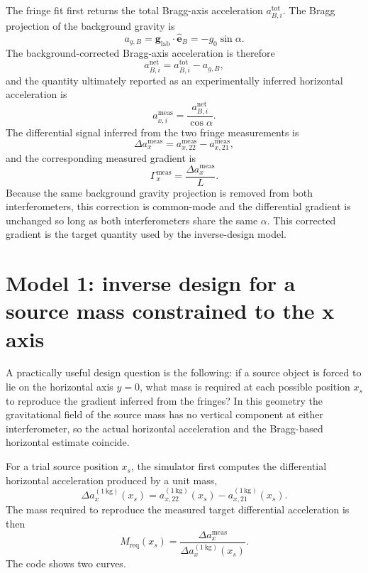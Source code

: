 \documentclass[11pt]{article}
\begin{document}
The fringe fit first returns the total Bragg-axis acceleration $a^{\mathrm{tot}}_{B,i}$. The Bragg projection of the background gravity is
\begin{equation}
 a_{g,B} = \mathbf{g}_{\mathrm{lab}} \cdot \hat{\mathbf{e}}_{B} = -g_0 \sin\alpha.
 \label{eq:gravity_projection}
\end{equation}
The background-corrected Bragg-axis acceleration is therefore
\begin{equation}
 a^{\mathrm{net}}_{B,i} = a^{\mathrm{tot}}_{B,i} - a_{g,B},
 \label{eq:beam_net}
\end{equation}
and the quantity ultimately reported as an experimentally inferred horizontal acceleration is
\begin{equation}
 a^{\mathrm{meas}}_{x,i} = \frac{a^{\mathrm{net}}_{B,i}}{\cos\alpha}.
 \label{eq:measured_x}
\end{equation}
The differential signal inferred from the two fringe measurements is
\begin{equation}
 \Delta a^{\mathrm{meas}}_x = a^{\mathrm{meas}}_{x,22} - a^{\mathrm{meas}}_{x,21},
\end{equation}
and the corresponding measured gradient is
\begin{equation}
 \Gamma^{\mathrm{meas}}_x = \frac{\Delta a^{\mathrm{meas}}_x}{L}.
 \label{eq:measured_gradient}
\end{equation}
Because the same background gravity projection is removed from both interferometers, this correction is common-mode and the differential gradient is unchanged so long as both interferometers share the same $\alpha$. This corrected gradient is the target quantity used by the inverse-design model.

\section{Model 1: inverse design for a source mass constrained to the x axis}

A practically useful design question is the following: if a source object is forced to lie on the horizontal axis $y=0$, what mass is required at each possible position $x_s$ to reproduce the gradient inferred from the fringes? In this geometry the gravitational field of the source mass has no vertical component at either interferometer, so the actual horizontal acceleration and the Bragg-based horizontal estimate coincide.

For a trial source position $x_s$, the simulator first computes the differential horizontal acceleration produced by a unit mass,
\begin{equation}
 \Delta a^{(1\,\mathrm{kg})}_x(x_s) = a^{(1\,\mathrm{kg})}_{x,22}(x_s) - a^{(1\,\mathrm{kg})}_{x,21}(x_s).
\end{equation}
The mass required to reproduce the measured target differential acceleration is then
\begin{equation}
 M_{\mathrm{req}}(x_s) = \frac{\Delta a^{\mathrm{meas}}_x}{\Delta a^{(1\,\mathrm{kg})}_x(x_s)}.
 \label{eq:required_mass}
\end{equation}
The code shows two curves.
\end{document}
